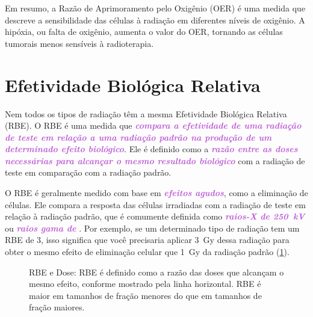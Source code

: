 \documentclass[11pt,a4paper]{article}
\newcounter{exemplo}
\begin{document}
	Em resumo, a Razão de Aprimoramento pelo Oxigênio (OER) é uma medida que descreve a sensibilidade das células à radiação em diferentes níveis de oxigênio. A hipóxia, ou falta de oxigênio, aumenta o valor do OER, tornando as células tumorais menos sensíveis à radioterapia.

\section{Efetividade Biológica Relativa}

	Nem todos os tipos de radiação têm a mesma Efetividade Biológica Relativa (RBE). O RBE é uma medida que \textcolor{MediumOrchid}{\textbf{\textit{compara a efetividade de uma radiação de teste em relação a uma radiação padrão na produção de um determinado efeito biológico}}}. Ele é definido como a \textcolor{MediumOrchid}{\textbf{\textit{razão entre as doses necessárias para alcançar o mesmo resultado biológico}}} com a radiação de teste em comparação com a radiação padrão.

	O RBE é geralmente medido com base em \textcolor{MediumOrchid}{\textbf{\textit{efeitos agudos}}}, como a eliminação de células. Ele compara a resposta das células irradiadas com a radiação de teste em relação à radiação padrão, que é comumente definida como \textcolor{MediumOrchid}{\textbf{\textit{raios-X de \SI{250}{\kilo\volt}}}} ou \textcolor{MediumOrchid}{\textbf{\textit{raios gama de }}}. Por exemplo, se um determinado tipo de radiação tem um RBE de 3, isso significa que você precisaria aplicar \SI{3}{\gray} dessa radiação para obter o mesmo efeito de eliminação celular que \SI{1}{\gray} da radiação padrão (\ref{fig:rbe}).

	\begin{figure}[h]
		\centering
		\caption{RBE e Dose: RBE é definido como a razão das doses que alcançam o mesmo efeito, conforme mostrado pela linha horizontal. RBE é maior em tamanhos de fração menores do que em tamanhos de fração maiores.}
		\label{fig:rbe}
	\end{figure}
\end{document}
